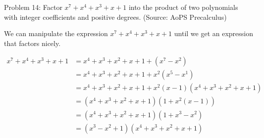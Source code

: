 Problem 14: Factor $x^7 + x^4 + x^3 + x + 1$ into the product of two polynomials with integer coefficients and positive degrees. (Source: AoPS Precalculus)

We can manipulate the expression $x^7 + x^4 + x^3 + x + 1$ until we get an expression that factors nicely.

\begin{align*}
x^7 + x^4 + x^3 + x + 1 &= x^4 + x^3 + x^2 + x + 1 + (x^7 - x^2) \\
&= x^4 + x^3 + x^2 + x + 1 + x^2(x^5 - x^1) \\
&= x^4 + x^3 + x^2 + x + 1 + x^2(x - 1)(x^4 + x^3 + x^2 + x + 1) \\
&= (x^4 + x^3 + x^2 + x + 1)(1 + x^2(x - 1)) \\
&= (x^4 + x^3 + x^2 + x + 1)(1 + x^3 - x^2) \\
&= \boxed{(x^3 - x^2 + 1)(x^4 + x^3 + x^2 + x + 1)}
\end{align*}
